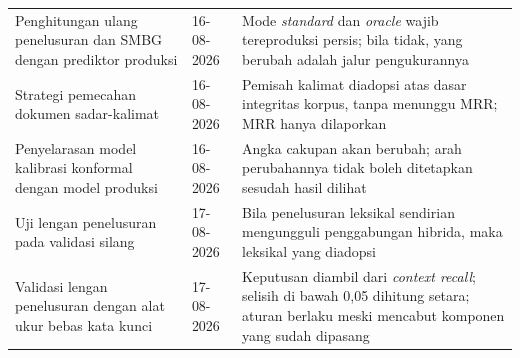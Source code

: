\begin{longtable}{@{}p{4.6cm}p{1.85cm}p{6.6cm}@{}}
Penghitungan ulang penelusuran dan SMBG dengan prediktor produksi & 16-08-2026 & Mode \emph{standard} dan \emph{oracle} wajib tereproduksi persis; bila tidak, yang berubah adalah jalur pengukurannya \\[3pt]

Strategi pemecahan dokumen sadar-kalimat & 16-08-2026 & Pemisah kalimat diadopsi atas dasar integritas korpus, tanpa menunggu MRR; MRR hanya dilaporkan \\[3pt]

Penyelarasan model kalibrasi konformal dengan model produksi & 16-08-2026 & Angka cakupan akan berubah; arah perubahannya tidak boleh ditetapkan sesudah hasil dilihat \\[3pt]

Uji lengan penelusuran pada validasi silang & 17-08-2026 & Bila penelusuran leksikal sendirian mengungguli penggabungan hibrida, maka leksikal yang diadopsi \\[3pt]

Validasi lengan penelusuran dengan alat ukur bebas kata kunci & 17-08-2026 & Keputusan diambil dari \emph{context recall}; selisih di bawah 0,05 dihitung setara; aturan berlaku meski mencabut komponen yang sudah dipasang \\
\end{longtable}
\endgroup
